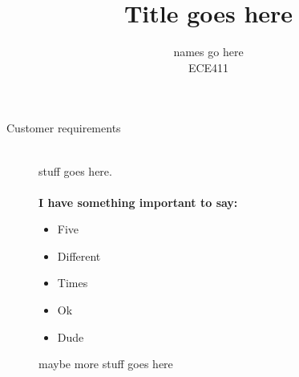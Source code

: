 \documentclass[12pt]{article}
\begin{document}
\title{Title goes here}%
\author{names go here\\ %
ECE411} %
 
\maketitle
 \small
\begin{description} 
	\item[Customer requirements] \hfill \\
		stuff goes here.\hfill \\ \\
		\textbf{I have something important to say:}
		\begin{itemize}
			\item{Five}
			\item{Different}
			\item{Times}
			\item{Ok}
			\item{Dude}
		\end{itemize}
		maybe more stuff goes here \\
\end{description}
\end{document}
